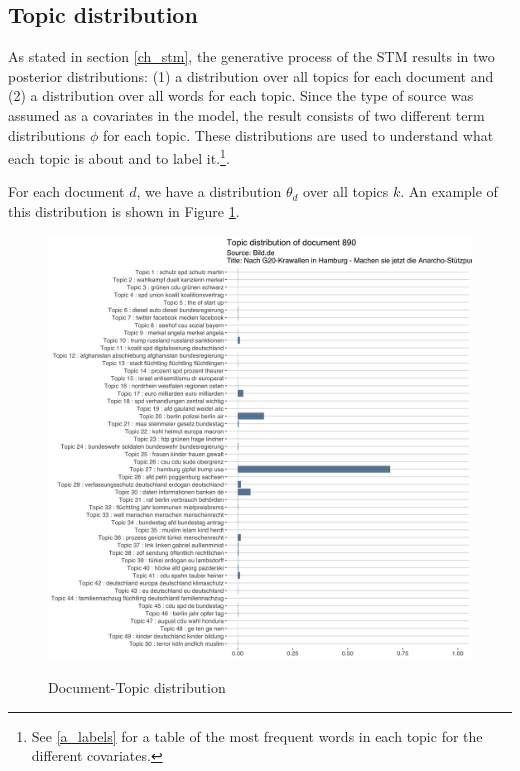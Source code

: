 \documentclass[12pt,a4paper,notitlepage]{article}
\begin{document}
\subsection{Topic distribution} 

As stated in section \ref{ch_stm}, the generative process of the STM results in two posterior distributions: (1) a distribution over all topics for each document and (2) a distribution over all words for each topic. Since the type of source was assumed as a covariates in the model, the result consists of two different term distributions $\phi$ for each topic. These distributions are used to understand what each topic is about and to label it.\footnote{See \ref{a_labels} for a table of the most frequent words in each topic for the different covariates.}.

For each document $d$, we have a distribution $\theta_d$ over all topics $k$. An example of this distribution is shown in Figure \ref{fig_doc_topic_distr}.

\begin{figure}[H]
\begin{center}
	\caption{Document-Topic distribution}
	\includegraphics[width=\textwidth]{../figs/doc_topic_distr}
	\label{fig_doc_topic_distr}
	\end{center}
\end{figure}
\end{document}
